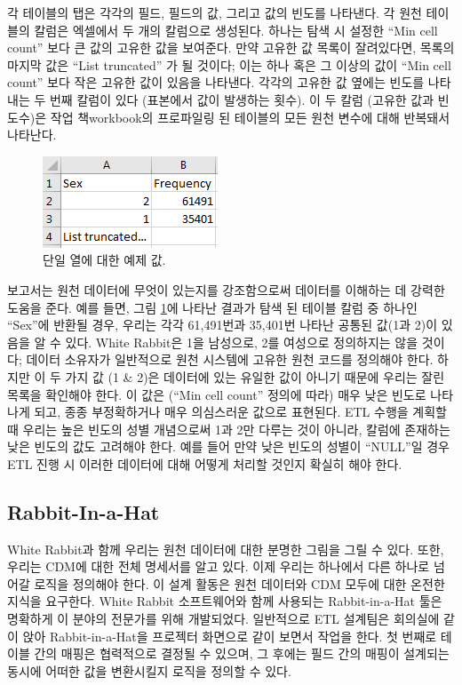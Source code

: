 \documentclass[10.5pt]{book}
\theoremstyle{definition}
\theoremstyle{definition}
\theoremstyle{definition}
\theoremstyle{remark}
\begin{document}
각 테이블의 탭은 각각의 필드, 필드의 값, 그리고 값의 빈도를 나타낸다. 각
원천 테이블의 칼럼은 엑셀에서 두 개의 칼럼으로 생성된다. 하나는 탐색 시
설정한 ``Min cell count'' 보다 큰 값의 고유한 값을 보여준다. 만약 고유한
값 목록이 잘려있다면, 목록의 마지막 값은 ``List truncated'' 가 될
것이다; 이는 하나 혹은 그 이상의 값이 ``Min cell count'' 보다 작은
고유한 값이 있음을 나타낸다. 각각의 고유한 값 옆에는 빈도를 나타내는 두
번째 칼럼이 있다 (표본에서 값이 발생하는 횟수). 이 두 칼럼 (고유한 값과
빈도수)은 작업 책workbook의 프로파일링 된 테이블의 모든 원천 변수에 대해
반복돼서 나타난다.

\begin{figure}

{\centering \includegraphics[width=0.3\linewidth]{images/ExtractTransformLoad/ScanSex} 

}

\caption{단일 열에 대한 예제 값.}\label{fig:scanSex}
\end{figure}

보고서는 원천 데이터에 무엇이 있는지를 강조함으로써 데이터를 이해하는 데
강력한 도움을 준다. 예를 들면, 그림 \ref{fig:scanSex}에 나타난 결과가
탐색 된 테이블 칼럼 중 하나인 ``Sex''에 반환될 경우, 우리는 각각
61,491번과 35,401번 나타난 공통된 값(1과 2)이 있음을 알 수 있다. White
Rabbit은 1을 남성으로, 2를 여성으로 정의하지는 않을 것이다; 데이터
소유자가 일반적으로 원천 시스템에 고유한 원천 코드를 정의해야 한다.
하지만 이 두 가지 값 (1 \& 2)은 데이터에 있는 유일한 값이 아니기 때문에
우리는 잘린 목록을 확인해야 한다. 이 값은 (``Min cell count'' 정의에
따라) 매우 낮은 빈도로 나타나게 되고, 종종 부정확하거나 매우 의심스러운
값으로 표현된다. ETL 수행을 계획할 때 우리는 높은 빈도의 성별 개념으로써
1과 2만 다루는 것이 아니라, 칼럼에 존재하는 낮은 빈도의 값도 고려해야
한다. 예를 들어 만약 낮은 빈도의 성별이 ``NULL''일 경우 ETL 진행 시
이러한 데이터에 대해 어떻게 처리할 것인지 확실히 해야 한다.

\subsection{Rabbit-In-a-Hat}\label{rabbit-in-a-hat}

White Rabbit과 함께 우리는 원천 데이터에 대한 분명한 그림을 그릴 수
있다. 또한, 우리는 CDM에 대한 전체 명세서를 알고 있다. 이제 우리는
하나에서 다른 하나로 넘어갈 로직을 정의해야 한다. 이 설계 활동은 원천
데이터와 CDM 모두에 대한 온전한 지식을 요구한다. White Rabbit
소프트웨어와 함께 사용되는 Rabbit-in-a-Hat 툴은 명확하게 이 분야의
전문가를 위해 개발되었다. 일반적으로 ETL 설계팀은 회의실에 같이 앉아
Rabbit-in-a-Hat을 프로젝터 화면으로 같이 보면서 작업을 한다. 첫 번째로
테이블 간의 매핑은 협력적으로 결정될 수 있으며, 그 후에는 필드 간의
매핑이 설계되는 동시에 어떠한 값을 변환시킬지 로직을 정의할 수 있다.
 
\end{document}
